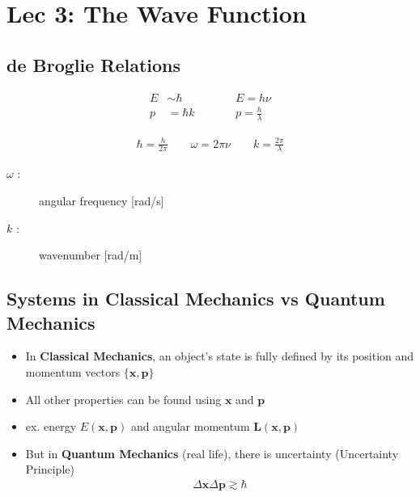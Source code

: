 \documentclass[a4paper,12pt]{article}
\newcommand{\vect}[1]{\mathbf{#1}}
\begin{document}
\section{Lec 3: The Wave Function}

\subsection{de Broglie Relations}
\begin{equation}
  \begin{aligned}
    E &\sim \hbar & \quad\quad &E = h\nu \\
    p &= \hbar k  & \quad\quad &p = \frac{h}{\lambda}
  \end{aligned}
\end{equation}

\begin{align}
  \hbar = \frac{h}{2\pi} \quad\quad  \omega = 2\pi\nu \quad\quad k = \frac{2\pi}{\lambda}
\end{align}

\begin{description}
  \item[$\omega$ :] angular frequency [rad/s]
  \item[$k$ :] wavenumber [rad/m]
\end{description}


\subsection{Systems in Classical Mechanics vs Quantum Mechanics}
\begin{itemize}
  \item In \textbf{Classical Mechanics}, an object's state is fully defined by its position and momentum vectors $\{\vect{x}, \vect{p}\}$
  \item All other properties can be found using $\vect{x}$ and $\vect{p}$
  \item ex. energy $E(\vect{x}, \vect{p})$ and angular momentum $\vect{L}(\vect{x}, \vect{p})$
  \item But in \textbf{Quantum Mechanics} (real life), there is uncertainty (Uncertainty Principle)
  \begin{align}
    \Delta \vect{x} \Delta \vect{p} \gtrsim \hbar
  \end{align}
\end{itemize}
\end{document}
